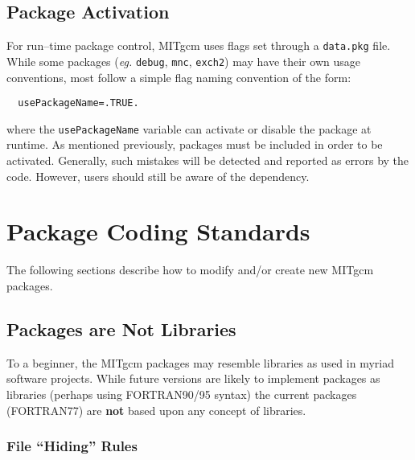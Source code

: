 \subsection{Package Activation}

For run--time package control, MITgcm uses flags set through a
\texttt{data.pkg} file.  While some packages (\textit{eg.}
\texttt{debug}, \texttt{mnc}, \texttt{exch2}) may have their own usage
conventions, most follow a simple flag naming convention of the form:
\begin{verbatim}
  usePackageName=.TRUE.
\end{verbatim}
where the \texttt{usePackageName} variable can activate or disable the
package at runtime.  As mentioned previously, packages must be
included in order to be activated.  Generally, such mistakes will be
detected and reported as errors by the code.  However, users should
still be aware of the dependency.


\section{Package Coding Standards}

The following sections describe how to modify and/or create new MITgcm
packages.

\subsection{Packages are Not Libraries}

To a beginner, the MITgcm packages may resemble libraries as used in
myriad software projects.  While future versions are likely to
implement packages as libraries (perhaps using FORTRAN90/95 syntax)
the current packages (FORTRAN77) are \textbf{not} based upon any
concept of libraries.

\subsubsection{File ``Hiding'' Rules}

